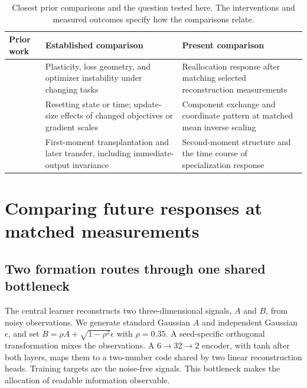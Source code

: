 \begin{table}[t]
\centering\small
\caption{Closest prior comparisons and the question tested here. The interventions and measured outcomes specify how the comparisons relate.}
\label{tab:prior}
\begin{tabularx}{\textwidth}{>{\raggedright\arraybackslash}p{}>{\raggedright\arraybackslash}X>{\raggedright\arraybackslash}X}
\toprule
Prior work & Established comparison & Present comparison\\
\midrule
\citet{lyle2023plasticity} & Plasticity, loss geometry, and optimizer instability under changing tasks & Reallocation response after matching selected reconstruction measurements\\
\citet{asadi2023resetting,ellis2024local} & Resetting state or time; update-size effects of changed objectives or gradient scales & Component exchange and coordinate pattern at matched mean inverse scaling\\
\citet{xu2026optimizer} & First-moment transplantation and later transfer, including immediate-output invariance & Second-moment structure and the time course of specialization response\\
\bottomrule
\end{tabularx}
\end{table}

\section{Comparing future responses at matched measurements}
\label{sec:design}
\subsection{Two formation routes through one shared bottleneck}
The central learner reconstructs two three-dimensional signals, $A$ and $B$, from noisy observations. We generate standard Gaussian $A$ and independent Gaussian $\epsilon$, and set $B=\rho A+\sqrt{1-\rho^2}\epsilon$ with $\rho=0.35$. A seed-specific orthogonal transformation mixes the observations. A $6\to32\to2$ encoder, with tanh after both layers, maps them to a two-number code shared by two linear reconstruction heads. Training targets are the noise-free signals. This bottleneck makes the allocation of readable information observable.


